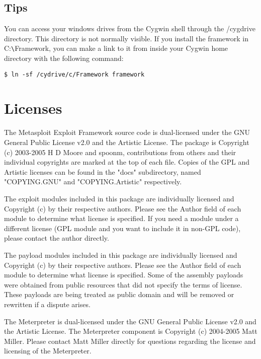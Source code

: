 \documentclass{report}
\begin{document}
	\section{Tips}
\par
You can access your windows drives from the Cygwin shell through the /cygdrive
directory. This directory is not normally visible. If you install the framework
in C:\verb#\#Framework, you can make a link to it from inside your Cygwin home
directory with the following command: 

\begin{verbatim}
$ ln -sf /cydrive/c/Framework framework
\end{verbatim}

\pagebreak
\chapter{Licenses}

\par
The Metasploit Exploit Framework source code is dual-licensed under the GNU
General Public License v2.0 and the Artistic License. The package is Copyright
(c) 2003-2005 H D Moore and spoonm, contributions from others and their
individual copyrights are marked at the top of each file. Copies of the GPL and
Artistic licenses can be found in the "docs" subdirectory, named "COPYING.GNU"
and "COPYING.Artistic" respectively.

\par
The exploit modules included in this package are individually licensed and
Copyright (c) by their respective authors. Please see the Author field of each
module to determine what license is specified. If you need a module under a
different license (GPL module and you want to include it in non-GPL code),
please contact the author directly.

\par
The payload modules included in this package are individually licensed and
Copyright (c) by their respective authors. Please see the Author field of each
module to determine what license is specified. Some of the assembly payloads
were obtained from public resources that did not specify the terms of license.
These payloads are being treated as public domain and will be removed or
rewritten if a dispute arises.

\par
The Meterpreter is dual-licensed under the GNU General Public License v2.0 and
the Artistic License. The Meterpreter component is Copyright (c) 2004-2005 Matt
Miller. Please contact Matt Miller directly for questions regarding the license
and licensing of the Meterpreter. 
\end{document}
